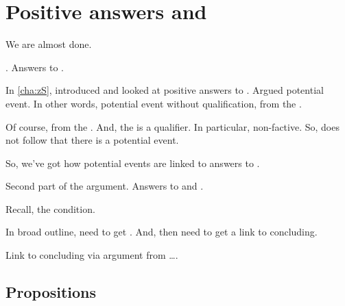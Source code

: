 \chapter{Positive answers and \qWhyV{}}
\label{cha:zSpAwhy}

\begin{note}
  We are almost done.

  \qzS{}.
  Answers to \qzS{}.

  In \autoref{cha:zS}, introduced and looked at positive answers to \qzS{}.
  Argued potential event.
  In other words, potential event without qualification, from the \agpe{}.

  Of course, from the \agpe{}.
  And, the \agpe{} is a qualifier.
  In particular, non-factive.
  So, does not follow that there is a potential event.
\end{note}

\begin{note}
  So, we've got how potential events are linked to answers to \qzS{}.

  Second part of the argument.
  Answers to \qzS{} and \qWhyV{}.
\end{note}

\begin{note}
  Recall, the condition.
\end{note}

\begin{note}
  In broad outline, need to get \support{}.
  And, then need to get a link to concluding.

  Link to concluding via argument from {\color{red} \dots}.
\end{note}

\section{Propositions}
\label{cha:zSpAwhy:sec:proposition}

